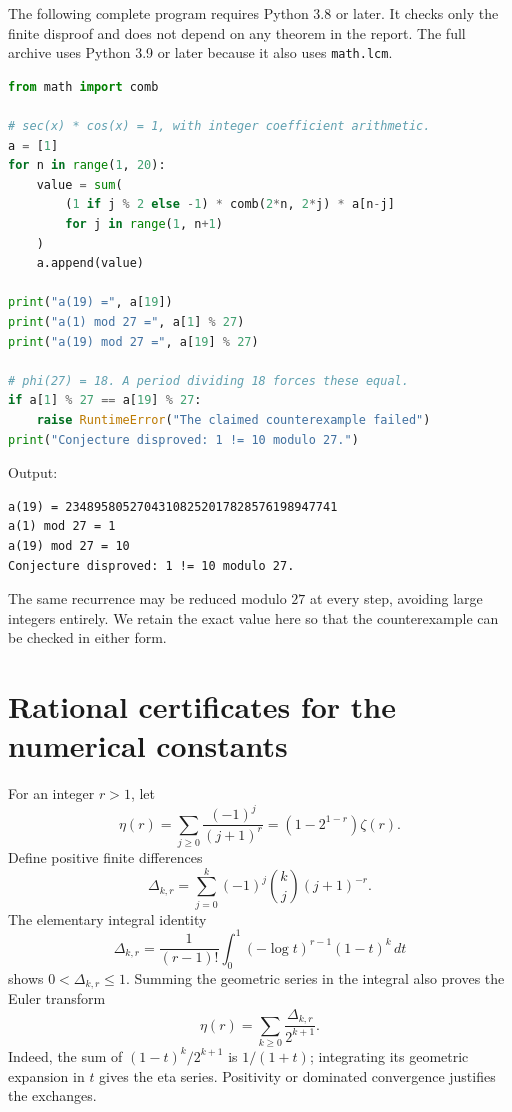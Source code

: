 \documentclass[11pt,a4paper]{article}
\numberwithin{equation}{section}
\theoremstyle{definition}
\begin{document}
The following complete program requires Python 3.8 or later. It checks
only the finite disproof and does not depend on any theorem in the report.
The full archive uses Python 3.9 or later because it also uses
\texttt{math.lcm}.

\begin{lstlisting}[language=Python]
from math import comb

# sec(x) * cos(x) = 1, with integer coefficient arithmetic.
a = [1]
for n in range(1, 20):
    value = sum(
        (1 if j % 2 else -1) * comb(2*n, 2*j) * a[n-j]
        for j in range(1, n+1)
    )
    a.append(value)

print("a(19) =", a[19])
print("a(1) mod 27 =", a[1] % 27)
print("a(19) mod 27 =", a[19] % 27)

# phi(27) = 18. A period dividing 18 forces these equal.
if a[1] % 27 == a[19] % 27:
    raise RuntimeError("The claimed counterexample failed")
print("Conjecture disproved: 1 != 10 modulo 27.")
\end{lstlisting}

Output:
\begin{lstlisting}
a(19) = 23489580527043108252017828576198947741
a(1) mod 27 = 1
a(19) mod 27 = 10
Conjecture disproved: 1 != 10 modulo 27.
\end{lstlisting}

The same recurrence may be reduced modulo $27$ at every step, avoiding
large integers entirely. We retain the exact value here so that the
counterexample can be checked in either form.

\clearpage
\section{Rational certificates for the numerical constants}
\label{app:certificates}

For an integer $r>1$, let
\[
\eta(r)=\sum_{j\ge0}\frac{(-1)^j}{(j+1)^r}
       =(1-2^{1-r})\zeta(r).
\]
Define positive finite differences
\[
\Delta_{k,r}=\sum_{j=0}^k(-1)^j\binom{k}{j}(j+1)^{-r}.
\]
The elementary integral identity
\begin{equation}\label{eq:positiveintegral}
\Delta_{k,r}
=\frac1{(r-1)!}\int_0^1(-\log t)^{r-1}(1-t)^k\,dt
\end{equation}
shows $0<\Delta_{k,r}\le1$. Summing the geometric series in the integral
also proves the Euler transform
\begin{equation}\label{eq:eulertransform}
\eta(r)=\sum_{k\ge0}\frac{\Delta_{k,r}}{2^{k+1}}.
\end{equation}
Indeed, the sum of $(1-t)^k/2^{k+1}$ is $1/(1+t)$; integrating its
geometric expansion in $t$ gives the eta series. Positivity or dominated
convergence justifies the exchanges.
\end{document}
